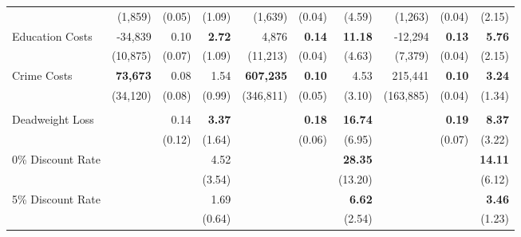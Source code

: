\begin{tabular}{l r r r r r r r r r}
	&	(1,859)	&	(0.05)	&	(1.09)	&	(1,639)	&	(0.04)	&	(4.59)	&	(1,263)	&	(0.04)	&	(2.15)	\\	
Education Costs	&	-34,839	&	0.10	&	\textbf{2.72}	&	4,876	&	\textbf{0.14}	&	\textbf{11.18}	&	-12,294	&	\textbf{0.13}	&	\textbf{5.76}	\\	
	&	(10,875)	&	(0.07)	&	(1.09)	&	(11,213)	&	(0.04)	&	(4.63)	&	(7,379)	&	(0.04)	&	(2.15)	\\	
Crime Costs	&	\textbf{73,673}	&	0.08	&	1.54	&	\textbf{607,235}	&	\textbf{0.10}	&	4.53	&	215,441	&	\textbf{0.10}	&	\textbf{3.24}	\\	
	&	(34,120)	&	(0.08)	&	(0.99)	&	(346,811)	&	(0.05)	&	(3.10)	&	(163,885)	&	(0.04)	&	(1.34)	\\ \\	
Deadweight Loss	&		&	0.14	&	\textbf{3.37}	&		&	\textbf{0.18}	&	\textbf{16.74}	&		&	\textbf{0.19}	&	\textbf{8.37}	\\	
	&		&	(0.12)	&	(1.64)	&		&	(0.06)	&	(6.95)	&		&	(0.07)	&	(3.22)	\\	
0\% Discount Rate	&		&		&	4.52	&		&		&	\textbf{28.35}	&		&		&	\textbf{14.11}	\\	
	&		&		&	(3.54)	&		&		&	(13.20)	&		&		&	(6.12)	\\	
5\% Discount Rate	&		&		&	1.69	&		&		&	\textbf{6.62}	&		&		&	\textbf{3.46}	\\	
	&		&		&	(0.64)	&		&		&	(2.54)	&		&		&	(1.23)	\\	
\bottomrule																				
\end{tabular}																				
